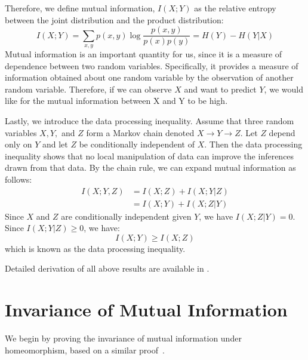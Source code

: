 Therefore, we define mutual information, $I(X; Y)$ as the relative entropy between the joint distribution and the product distribution:
\begin{equation}\label{eqn: Mutual Info}
	I(X; Y) = \sum_{x, y} p(x, y) \log{\frac{p(x,y)}{p(x) p(y)}} = H(Y) - H(Y|X)
\end{equation}
Mutual information is an important quantity for us, since it is a measure of dependence between two random variables. 
Specifically, it provides a measure of information obtained about one random variable by the observation of another random variable.
Therefore, if we can observe $X$ and want to predict $Y$, we would like for the mutual information between X and Y to be high. 

Lastly, we introduce the data processing inequality.
Assume that three random variables $X, Y,$ and $Z$  form a Markov chain denoted $X \to Y \to Z$.
Let $Z$ depend only on $Y$ and let $Z$ be conditionally independent of $X$. 
Then the data processing inequality shows that no local manipulation of data can improve the inferences drawn from that data.
By the chain rule, we can expand mutual information as follows:
\begin{align}
I(X; Y, Z) & = I(X; Z) + I(X; Y|Z) \\
& = I(X; Y) + I(X; Z|Y)
\end{align}
Since $X$ and $Z$ are conditionally independent given $Y$, we have $I(X; Z|Y) = 0$. 
Since $I(X; Y|Z) \geq 0$, we have:
\begin{equation} \label{eqn:DPI}
I(X; Y) \geq I(X; Z)	
\end{equation}
which is known as the data processing inequality. 

Detailed derivation of all above results are available in \cite{coverthomas2006}.

\section{Invariance of Mutual Information}\label{invariance}

We begin by proving the invariance of mutual information under homeomorphism, based on a similar proof~\cite{kraskov2004estimating}.

